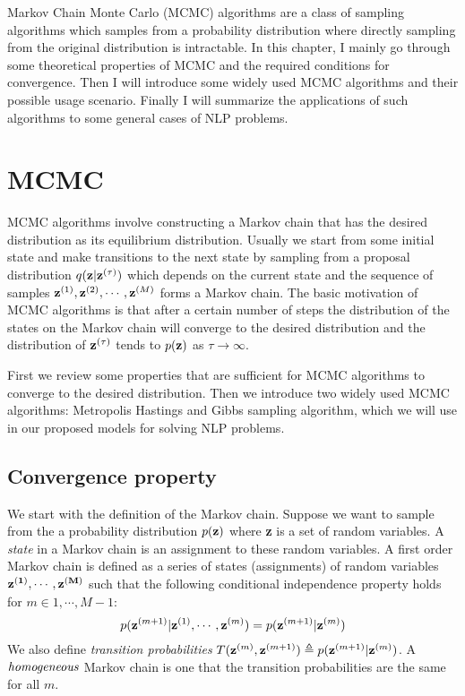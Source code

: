 Markov Chain Monte Carlo (MCMC) algorithms are a class of sampling algorithms which samples from a probability distribution where directly sampling
from the original distribution is intractable. 
In this chapter, I mainly go through some theoretical properties of MCMC and the required conditions for convergence.
Then I will introduce some widely used MCMC algorithms and their possible usage scenario. Finally I will summarize the applications of such algorithms to 
some general cases of NLP problems.
\section{MCMC}
MCMC algorithms involve constructing a Markov chain that has the desired distribution as its equilibrium distribution.
Usually we start from some initial state and make transitions to the next state by sampling from a proposal distribution $q({\bf z}|{\bf z}^{(\tau)})$ which depends on
the current state and the sequence of samples ${\bf z}^{(1)}, {\bf z}^{(2)}, \cdots, {\bf z}^{(M)}$ forms a Markov chain.
The basic motivation of MCMC algorithms is that after a certain number of steps the distribution of the states on the Markov chain will converge to
the desired distribution and the distribution of ${\bf z}^{(\tau)}$ tends to $p({\bf z})$ as $\tau \rightarrow \infty$.%


First we review some properties that are sufficient for MCMC algorithms to converge to the desired distribution. Then we introduce two widely used MCMC algorithms: Metropolis Hastings and Gibbs sampling algorithm, which we will use 
in our proposed models for solving NLP problems.
\subsection{Convergence property}
We start with the definition of the Markov chain.
Suppose we want to sample from the a probability distribution $p({\bf z})$ where {\bf z} is a set of random variables.
A {\it state} in a Markov chain is an assignment to these random variables.
A first order Markov chain is defined as a series of states (assignments) of random variables ${\bf z^{(1)}},\cdots,{\bf z^{(M)}}$ such that the following conditional independence property holds for $m \in {1,\cdots,M-1}$:
$$p({\bf z}^{(m+1)}|{\bf z}^{(1)}, \cdots, {\bf z}^{(m)})=p({\bf z}^{(m+1)}|{\bf z}^{(m)})$$
We also define {\it transition probabilities} $T({\bf z}^{(m)},{\bf z}^{(m+1)})\triangleq p({\bf z}^{(m+1)}|{\bf z}^{(m)})$. A ${\it homogeneous}$ Markov chain is one that
the transition probabilities are the same for all $m$.


